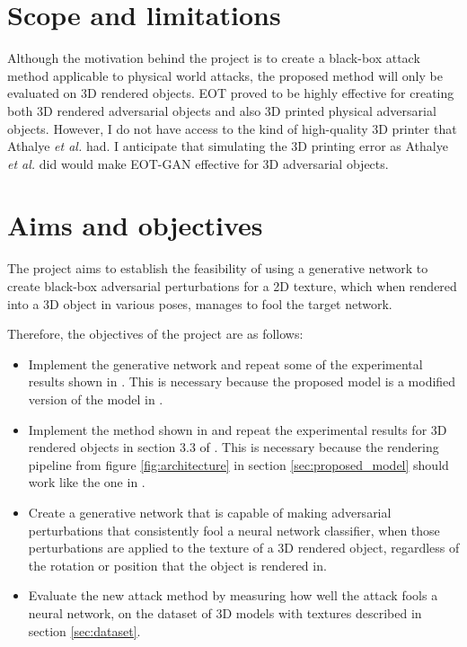 \section{Scope and limitations}
    \label{sec:scope_limitations}
    
Although the motivation behind the project is to create a black-box attack method applicable to physical world attacks, the proposed method will only be evaluated on 3D rendered objects. EOT \cite{athalye} proved to be highly effective for creating both 3D rendered adversarial objects and also 3D printed physical adversarial objects. However, I do not have access to the kind of high-quality 3D printer that Athalye \textit{et al.} \cite{athalye} had. I anticipate that simulating the 3D printing error as Athalye \textit{et al.} \cite{athalye} did would make EOT-GAN effective for 3D adversarial objects.

\section{Aims and objectives}
    \label{sec:aims_objectives}

The project aims to establish the feasibility of using a generative network to create black-box adversarial perturbations for a 2D texture, which when rendered into a 3D object in various poses, manages to fool the target network. 

Therefore, the objectives of the project are as follows:

\begin{itemize}
    \item Implement the generative network and repeat some of the experimental results shown in \cite{zheng_black_box_GAN}. This is necessary because the proposed model is a modified version of the model in \cite{zheng_black_box_GAN}.
    \item Implement the method shown in \cite{athalye} and repeat the experimental results for 3D rendered objects in section 3.3 of \cite{athalye}. This is necessary because the rendering pipeline from figure \ref{fig:architecture} in section \ref{sec:proposed_model} should work like the one in \cite{athalye}.
    \item Create a generative network that is capable of making adversarial perturbations that consistently fool a neural network classifier, when those perturbations are applied to the texture of a 3D rendered object, regardless of the rotation or position that the object is rendered in.
    \item Evaluate the new attack method by measuring how well the attack fools a neural network, on the dataset of 3D models with textures described in section \ref{sec:dataset}.
\end{itemize}


